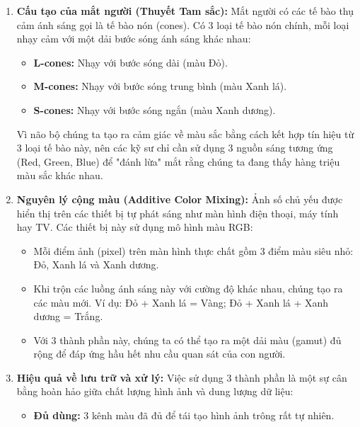 \begin{enumerate}
	\item \textbf{Cấu tạo của mắt người (Thuyết Tam sắc): }
	Mắt người có các tế bào thụ cảm ánh sáng gọi là tế bào nón (cones). Có 3 loại tế bào nón chính, mỗi loại nhạy cảm với một dải bước sóng ánh sáng khác nhau:
	
	\begin{itemize}
		\item \textbf{L-cones:} Nhạy với bước sóng dài (màu Đỏ).
		
		\item \textbf{M-cones:} Nhạy với bước sóng trung bình (màu Xanh lá).
		
		\item \textbf{S-cones:} Nhạy với bước sóng ngắn (màu Xanh dương).
	\end{itemize}
	
	Vì não bộ chúng ta tạo ra cảm giác về màu sắc bằng cách kết hợp tín hiệu từ 3 loại tế bào này, nên các kỹ sư chỉ cần sử dụng 3 nguồn sáng tương ứng (Red, Green, Blue) để "đánh lừa" mắt rằng chúng ta đang thấy hàng triệu màu sắc khác nhau.
	
	\item \textbf{Nguyên lý cộng màu (Additive Color Mixing): }
	Ảnh số chủ yếu được hiển thị trên các thiết bị tự phát sáng như màn hình điện thoại, máy tính hay TV. Các thiết bị này sử dụng mô hình màu RGB:
	
	\begin{itemize}
		\item Mỗi điểm ảnh (pixel) trên màn hình thực chất gồm 3 điểm màu siêu nhỏ: Đỏ, Xanh lá và Xanh dương.
		
		\item Khi trộn các luồng ánh sáng này với cường độ khác nhau, chúng tạo ra các màu mới. Ví dụ: Đỏ + Xanh lá = Vàng; Đỏ + Xanh lá + Xanh dương = Trắng.
		
		\item Với 3 thành phần này, chúng ta có thể tạo ra một dải màu (gamut) đủ rộng để đáp ứng hầu hết nhu cầu quan sát của con người.
	\end{itemize}
	
	\item \textbf{Hiệu quả về lưu trữ và xử lý: }
	Việc sử dụng 3 thành phần là một sự cân bằng hoàn hảo giữa chất lượng hình ảnh và dung lượng dữ liệu:
	
	\begin{itemize}
		\item \textbf{Đủ dùng:} 3 kênh màu đã đủ để tái tạo hình ảnh trông rất tự nhiên.
		

\end{itemize}
\end{enumerate}
